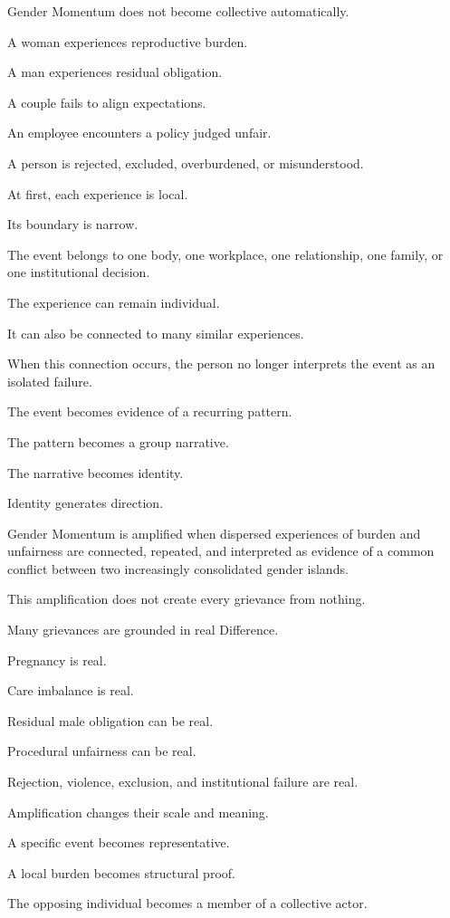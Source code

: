 Gender Momentum does not become collective automatically.

A woman experiences reproductive burden.

A man experiences residual obligation.

A couple fails to align expectations.

An employee encounters a policy judged unfair.

A person is rejected, excluded, overburdened, or misunderstood.

At first, each experience is local.

Its boundary is narrow.

The event belongs to one body, one workplace, one relationship, one family, or one institutional decision.

The experience can remain individual.

It can also be connected to many similar experiences.

When this connection occurs, the person no longer interprets the event as an isolated failure.

The event becomes evidence of a recurring pattern.

The pattern becomes a group narrative.

The narrative becomes identity.

Identity generates direction.

Gender Momentum is amplified when dispersed experiences of burden and unfairness are connected, repeated, and interpreted as evidence of a common conflict between two increasingly consolidated gender islands.

This amplification does not create every grievance from nothing.

Many grievances are grounded in real Difference.

Pregnancy is real.

Care imbalance is real.

Residual male obligation can be real.

Procedural unfairness can be real.

Rejection, violence, exclusion, and institutional failure are real.

Amplification changes their scale and meaning.

A specific event becomes representative.

A local burden becomes structural proof.

The opposing individual becomes a member of a collective actor.

